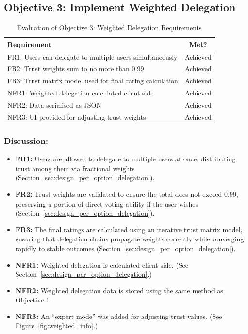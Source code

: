 \subsection{Objective 3: Implement Weighted Delegation}

\begin{table}[H]
\centering
\begin{tabular}{|p{9cm}|c|}
\hline
\textbf{Requirement} & \textbf{Met?} \\ \hline
FR1: Users can delegate to multiple users simultaneously & Achieved \\ \hline
FR2: Trust weights sum to no more than 0.99 & Achieved \\ \hline
FR3: Trust matrix model used for final rating calculation & Achieved \\ \hline
NFR1: Weighted delegation calculated client-side & Achieved \\ \hline
NFR2: Data serialised as JSON & Achieved \\ \hline
NFR3: UI provided for adjusting trust weights & Achieved \\ \hline
\end{tabular}
\caption{Evaluation of Objective 3: Weighted Delegation Requirements}
\label{tab:objective3_requirements}
\end{table}

\subsubsection{Discussion:}

\begin{itemize}
    \item \textbf{FR1:} Users are allowed to delegate to multiple users at once, distributing trust among them via fractional weights (Section~\ref{sec:design_per_option_delegation}).
    \item \textbf{FR2:} Trust weights are validated to ensure the total does not exceed 0.99, preserving a portion of direct voting ability if the user wishes (Section~\ref{sec:design_per_option_delegation}).
    \item \textbf{FR3:} The final ratings are calculated using an iterative trust matrix model, ensuring that delegation chains propagate weights correctly while converging rapidly to stable outcomes (Section~\ref{sec:design_per_option_delegation}).
    \item \textbf{NFR1:} Weighted delegation is calculated client-side. (See Section~\ref{sec:design_per_option_delegation}.)
    \item \textbf{NFR2:} Weighted delegation data is stored using the same method as Objective 1.
    \item \textbf{NFR3:} An ``expert mode'' was added for adjusting trust values. (See Figure~\ref{fig:weighted_info}.)

\end{itemize}

